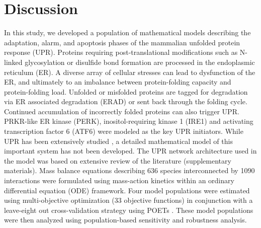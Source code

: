 \documentclass[fleqn,10pt]{wlscirep}
\begin{document}
\section*{Discussion}

In this study, we developed a population of mathematical models describing the adaptation, alarm, and apoptosis phases of the mammalian unfolded protein response (UPR).
Proteins requiring post-translational modifications such as N-linked glycosylation or disulfide bond formation are processed in the endoplasmic reticulum (ER).
A diverse array of cellular stresses can lead to dysfunction of the ER, and ultimately to an imbalance between protein-folding capacity and protein-folding load.
Unfolded or misfolded proteins are tagged for degradation via ER associated degradation (ERAD) or sent back through the folding cycle.
Continued accumulation of incorrectly folded proteins can also trigger UPR.
PRKR-like ER kinase (PERK), inositol-requiring kinase 1 (IRE1) and activating transcription factor 6 (ATF6) were modeled as the key UPR initiators.
While UPR has been extensively studied \cite{naidoo2009er, ron2002translational, kaufman2002unfolded,ellgaard2003qce,Fonseca:2009fk,Schroder:2005vn,gotoh:hdc,mccullough2001gsc, belmont2008cga,Hetz:2009qc,Urano:2000uq,szegezdi2006mediators},
a detailed mathematical model of this important system has not been developed.
The UPR network architecture used in the model was based on extensive review of the literature (supplementary materials).
Mass balance equations describing 636 species interconnected by 1090 interactions were formulated using mass-action kinetics within an ordinary differential equation (ODE) framework.
Four model populations were estimated using multi-objective optimization (33 objective functions) in conjunction with a leave-eight out cross-validation strategy using POETs \cite{Song:2010ij}.
These model populations were then analyzed using population-based sensitivity and robustness analysis.
\end{document}

